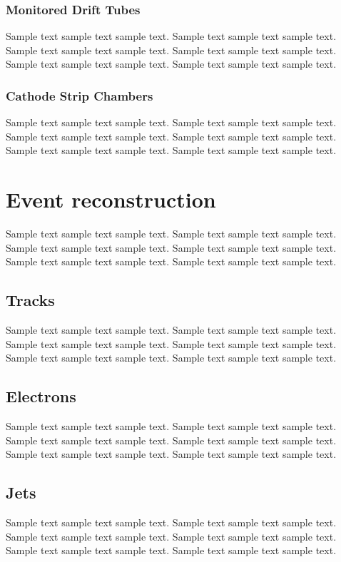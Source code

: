 \subsubsection{Monitored Drift Tubes}
Sample text sample text sample text. Sample text sample text sample text.
Sample text sample text sample text. Sample text sample text sample text.
Sample text sample text sample text. Sample text sample text sample text.

\subsubsection{Cathode Strip Chambers}
Sample text sample text sample text. Sample text sample text sample text.
Sample text sample text sample text. Sample text sample text sample text.
Sample text sample text sample text. Sample text sample text sample text.

\section{Event reconstruction}
Sample text sample text sample text. Sample text sample text sample text.
Sample text sample text sample text. Sample text sample text sample text.
Sample text sample text sample text. Sample text sample text sample text.

\subsection{Tracks}
Sample text sample text sample text. Sample text sample text sample text.
Sample text sample text sample text. Sample text sample text sample text.
Sample text sample text sample text. Sample text sample text sample text.

\subsection{Electrons}
Sample text sample text sample text. Sample text sample text sample text.
Sample text sample text sample text. Sample text sample text sample text.
Sample text sample text sample text. Sample text sample text sample text.

\subsection{Jets}
Sample text sample text sample text. Sample text sample text sample text.
Sample text sample text sample text. Sample text sample text sample text.
Sample text sample text sample text. Sample text sample text sample text.

